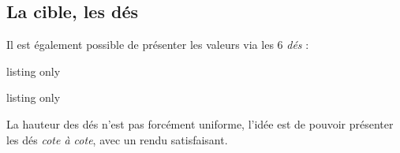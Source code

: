 \documentclass[11pt,a4paper]{ltxdoc}
\begin{document}
\begin{DemoCode}{}
\end{DemoCode}

\begin{DemoCode}{}
\end{DemoCode}

\begin{DemoCode}{}
\end{DemoCode}

\begin{DemoCode}{}
\def\mathadorplussymb{\vphantom{\faPlus\faMinus\faDivide\faTimes}\faPlus}
\def\mathadormoinssymb{\vphantom{\faPlus\faMinus\faDivide\faTimes}\faMinus}
\def\mathadorfoissymb{\vphantom{\faPlus\faMinus\faDivide\faTimes}\faTimes}
\def\mathadordivsymb{\vphantom{\faPlus\faMinus\faDivide\faTimes}\faDivide}

\PlateauMathador[rayon=1.75cm,logo=false]{,,,,}{}
\end{DemoCode}

\subsection{La cible, les dés}

Il est également possible de présenter les valeurs via les 6 \textit{dés} :

\begin{DemoCode}{listing only}
\end{DemoCode}

\begin{DemoCode}{listing only}
\end{DemoCode}

La hauteur des dés n'est pas forcément uniforme, l'idée est de pouvoir présenter les dés \textit{cote à cote}, avec un rendu satisfaisant.

\begin{DemoCode}{}
\end{DemoCode}
\end{document}
